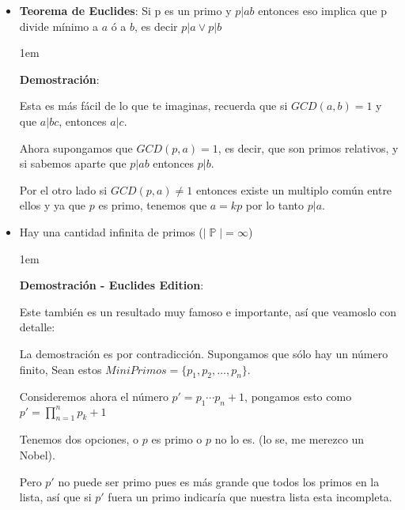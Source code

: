 \documentclass[12pt]{report}                                    %
\newenvironment{SmallIndentation}[1][0.75em]                    %
    {\begin{adjustwidth}{#1}{}\begin{footnotesize}}                 %
    {\end{footnotesize}\end{adjustwidth}}                           %
\DeclareMathOperator \Naturals  {\mathbb{N}}                     %
\DeclareMathOperator \Primes    {\mathbb{P}}                     %
\begin{document}
        \begin{itemize}

            \item \textbf{Teorema de Euclides}:
                Si p es un primo y $p|ab$ entonces eso implica que p divide mínimo
                a $a$ ó a $b$, es decir $p|a \lor p|b$

                \begin{SmallIndentation}[1em]
                    \textbf{Demostración}:

                    Esta es más fácil de lo que te imaginas, recuerda que si
                    $GCD(a,b) = 1$ y que $a|bc$, entonces $a|c$.

                    Ahora supongamos que $GCD(p,a) = 1$, es decir, que son primos
                    relativos, y si sabemos aparte que $p|ab$ entonces $p|b$.

                    Por el otro lado si $GCD(p, a) \neq 1$ entonces existe un multiplo
                    común entre ellos y ya que $p$ es primo, tenemos que $a=kp$ por lo
                    tanto $p|a$.

                \end{SmallIndentation}


            \item Hay una cantidad infinita de primos ($|\Primes| = \infty$)

                \begin{SmallIndentation}[1em]
                    \textbf{Demostración - Euclides Edition}:

                    Este también es un resultado muy famoso e importante, así
                    que veamoslo con detalle:

                    La demostración es por contradicción.
                    Supongamos que sólo hay un número finito, Sean estos 
                    $MiniPrimos = \{ p_1, p_2, \dots, p_n\}$.

                    Consideremos ahora el número $p'=p_1 \cdots p_n + 1$,
                    pongamos esto como $p' = \prod_{n=1}^{n} p_k +1$

                    Tenemos dos opciones, o $p$ es primo o $p$ no lo es.
                    (lo se, me merezco un Nobel).

                    Pero $p'$ no puede ser primo pues es más grande que
                    todos los primos en la lista, así que si $p'$ fuera
                    un primo indicaría que nuestra lista esta incompleta.


\end{SmallIndentation}
\end{itemize}
\end{document}
